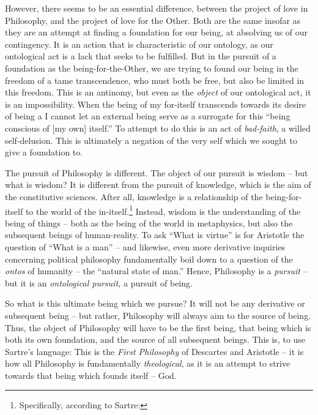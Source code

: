 However, there seems to be an essential difference, between the project of love in Philosophy, and the project of love for the Other. Both are the same insofar as they are an attempt at finding a foundation for our being, at absolving us of our contingency. It is an action that is characteristic of our ontology, as our ontological act is a lack that seeks to be fulfilled. But in the pursuit of a foundation as the being-for-the-Other, we are trying to found our being in the freedom of a tame transcendence, who must both be free, but also be limited in this freedom. This is an antinomy, but even as the \emph{object} of our ontological act, it is an impossibility. When the being of my for-itself transcends towards its desire of being a  I cannot let an external being serve as a surrogate for this \enquote{being conscious of [my own] itself.} 
To attempt to do this is an act of \emph{bad-faith}, a willed self-delusion. This is ultimately a negation of the very self which we sought to give a foundation to.  

The pursuit of Philosophy is different. The object of our pursuit is wisdom -- but what is wisdom? It is different from the pursuit of knowledge, which is the aim of the constitutive sciences. After all, knowledge is a relationship of the being-for-itself to the world of the in-itself.\footnote{Specifically,  according to Sartre: } Instead, wisdom is the understanding of the being of things -- both as the being of the world in metaphysics, but also the subsequent beings of human-reality. To ask \enquote{What is virtue} is for Aristotle the question of \enquote{What is a man} -- and likewise, even more derivative inquiries concerning political philosophy fundamentally boil down to a question of the \emph{ontos} of humanity -- the \enquote{natural state of man.} Hence, Philosophy is a \emph{pursuit} -- but it is an \emph{ontological pursuit,} a pursuit of being.


So what is this ultimate being which we pursue? It will not be any derivative or subsequent being -- but rather, Philosophy will always aim to the source of being. Thus, the object of Philosophy will have to be the first being, that being which is both its own foundation, and the source of all subsequent beings. This is, to use Sartre's language:  This is the \emph{First Philosophy} of Descartes and Aristotle -- it is how all Philosophy is fundamentally \emph{theological}, as it is an attempt to strive towards that being which founds itself -- God.


